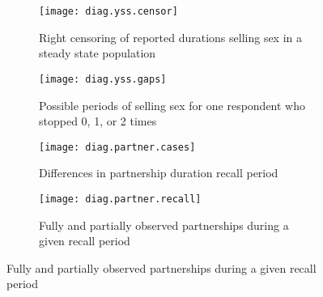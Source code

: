 \begin{figure}
  \begin{subfigure}[b]{\textwidth}
    \centering\texttt{[image: diag.yss.censor]}
    \caption{Right censoring of reported durations selling sex in a steady state population}
    \label{fig:diag.yss.censor}
  \end{subfigure}
  \begin{subfigure}[b]{\textwidth}
    \centering\texttt{[image: diag.yss.gaps]}
    \caption{Possible periods of selling sex for one respondent who stopped 0, 1, or 2 times}
    \label{fig:diag.yss.gaps}
  \end{subfigure}
  \begin{subfigure}[b]{\textwidth}
    \centering\texttt{[image: diag.partner.cases]}
    \caption{Differences in partnership duration \vs recall period}
    \label{fig:diag.partner.cases}
  \end{subfigure}
  \begin{subfigure}[b]{\textwidth}
    \centering\texttt{[image: diag.partner.recall]}
    \caption{Fully and partially observed partnerships during a given recall period}
    \label{fig:diag.partner.recall}
  \end{subfigure}
  \label{fig:diag}
\end{figure}
